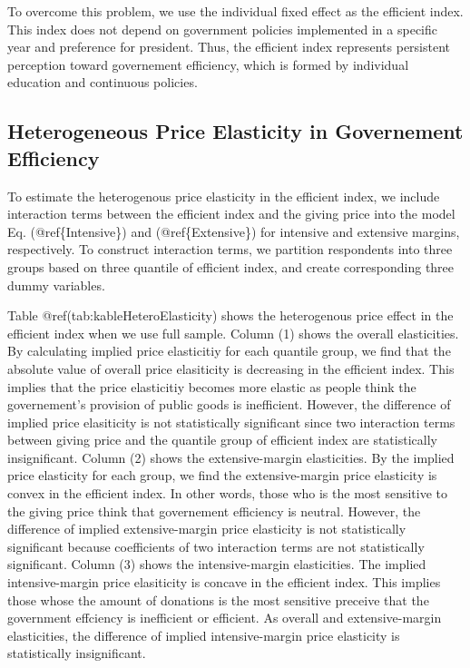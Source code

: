 \documentclass[
]{article}
\begin{document}
To overcome this problem, we use the individual fixed effect as the efficient index.
This index does not depend on government policies implemented in a specific year and preference for president.
Thus, the efficient index represents persistent perception toward governement efficiency,
which is formed by individual education and continuous policies.

\hypertarget{heterogeneous-price-elasticity-in-governement-efficiency}{%
\subsection{Heterogeneous Price Elasticity in Governement Efficiency}\label{heterogeneous-price-elasticity-in-governement-efficiency}}

To estimate the heterogenous price elasticity in the efficient index,
we include interaction terms between the efficient index and the giving price
into the model Eq. (@ref\{Intensive\}) and (@ref\{Extensive\}) for intensive and extensive margins, respectively.
To construct interaction terms, we partition respondents into three groups based on three quantile of efficient index,
and create corresponding three dummy variables.

Table @ref(tab:kableHeteroElasticity) shows the heterogenous price effect in the efficient index
when we use full sample.
Column (1) shows the overall elasticities.
By calculating implied price elasticitiy for each quantile group,
we find that the absolute value of overall price elasiticity is decreasing in the efficient index.
This implies that the price elasticitiy becomes more elastic
as people think the governement's provision of public goods is inefficient.
However,
the difference of implied price elasiticity is not statistically significant
since two interaction terms between giving price and the quantile group of efficient index are statistically insignificant.
Column (2) shows the extensive-margin elasticities.
By the implied price elasticity for each group,
we find the extensive-margin price elasticity is convex in the efficient index.
In other words, those who is the most sensitive to the giving price think that
governement efficiency is neutral.
However, the difference of implied extensive-margin price elasticity is not statistically significant
because coefficients of two interaction terms are not statistically significant.
Column (3) shows the intensive-margin elasticities.
The implied intensive-margin price elasiticity is concave in the efficient index.
This implies those whose the amount of donations is the most sensitive preceive that
the government effciency is inefficient or efficient.
As overall and extensive-margin elasticities,
the difference of implied intensive-margin price elasticity is statistically insignificant.
\end{document}
